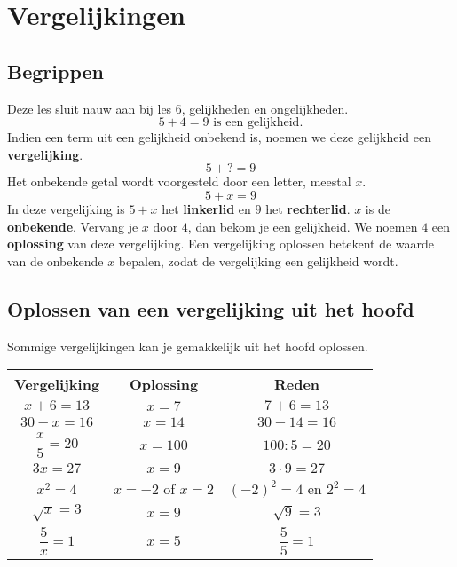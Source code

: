 \documentclass[12pt]{article}
\begin{document}
\ConfigureExSol

\setcounter{section}{15}
\section{Vergelijkingen}


\subsection{Begrippen}

Deze les sluit nauw aan bij les 6, gelijkheden en ongelijkheden.
$$5 + 4 = 9 \mbox{ is een gelijkheid.}$$
Indien een term uit een gelijkheid onbekend is, noemen we deze gelijkheid een {\bf vergelijking}.
$$5 + ? = 9$$
Het onbekende getal wordt voorgesteld door een letter, meestal $x$.
$$5 + x = 9$$
In deze vergelijking is $5 + x$ het {\bf linkerlid} en $9$ het {\bf rechterlid}.
$x$ is de {\bf onbekende}.
Vervang je $x$ door $4$, dan bekom je een gelijkheid. We noemen $4$ een {\bf oplossing} van deze vergelijking.
Een vergelijking oplossen betekent de waarde van de onbekende $x$ bepalen, zodat de vergelijking een gelijkheid wordt.

\subsection{Oplossen van een vergelijking uit het hoofd}

Sommige vergelijkingen kan je gemakkelijk uit het hoofd oplossen.

\begin{voorbeeld*}
\begin{center}
  \begin{tabular}{c|c|c}
  Vergelijking & Oplossing & Reden\\
  \hline
  $x+6 = 13$ & $x=7$ & $7+6=13$\\
  $30 - x = 16$ &	$x = 14$ & $30 - 14 = 16$\\
  $\dfrac{x}{5} = 20$ & $x = 100$	& $100 : 5 = 20$\\
  $3x = 27$	& $x = 9$	&	$3\cdot 9 = 27$\\
  $x^2=4$ & $x=-2$ of $x=2$ & $(-2)^2=4$ en $2^2=4$\\
  $\sqrt{x}=3$ & $x=9$ & $\sqrt{9}=3$\\
  $\dfrac{5}{x}=1$ & $x=5$ & $\dfrac{5}{5}=1$
  \end{tabular}
\end{center}
\end{voorbeeld*}
\end{document}
